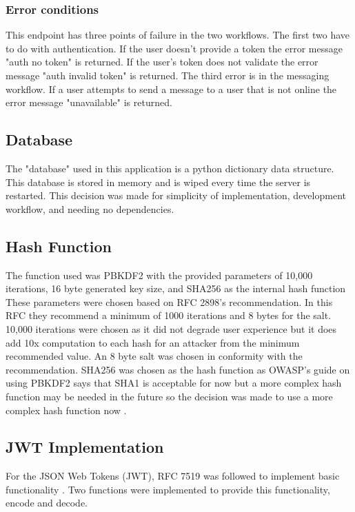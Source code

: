 \subsubsection{Error conditions}


This endpoint has three points of failure in the two workflows. The first two have to do with authentication. If the user doesn't provide a token the error message "auth no token" is returned. If the user's token does not validate the error message "auth invalid token" is returned. The third error is in the messaging workflow. If a user attempts to send a message to a user that is not online the error message "unavailable" is returned.


\subsection{Database}


The "database" used in this application is a python dictionary data structure. This database is stored in memory and is wiped every time the server is restarted. This decision was made for simplicity of implementation, development workflow, and needing no dependencies. 


\subsection{Hash Function}


The function used was PBKDF2 with the provided parameters of 10,000 iterations, 16 byte generated key size, and SHA256 as the internal hash function \cite{pkcs-rfc}\cite{dsa-rfc} These parameters were chosen based on RFC 2898's recommendation. In this RFC they recommend a minimum of 1000 iterations and 8 bytes for the salt. 10,000 iterations were chosen as it did not degrade user experience but it does add 10x computation to each hash for an attacker from the minimum recommended value. An 8 byte salt was chosen in conformity with the recommendation. SHA256 was chosen as the hash function as OWASP's guide on using PBKDF2 says that SHA1 is acceptable for now but a more complex hash function may be needed in the future so the decision was made to use a more complex hash function now \cite{owasp-pbkdf}.


\subsection{JWT Implementation}


For the JSON Web Tokens (JWT), RFC 7519 was followed to implement basic functionality \cite{jwt-rfc}. Two functions were implemented to provide this functionality, encode and decode.


